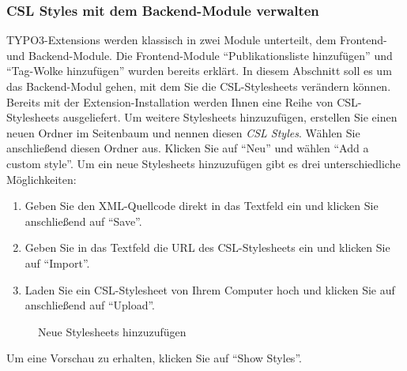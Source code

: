 \subsubsection*{CSL Styles mit dem Backend-Module verwalten}\label{typo3CslBackend}
\newline
TYPO3-Extensions werden klassisch in zwei Module unterteilt, dem Frontend- und Backend-Module. Die Frontend-Module \enquote{Publikationsliste hinzufügen} und \enquote{Tag-Wolke hinzufügen} wurden bereits erklärt. In diesem Abschnitt soll es um das Backend-Modul gehen, mit dem Sie die CSL-Stylesheets verändern können.\newline \newline
Bereits mit der Extension-Installation werden Ihnen eine Reihe von CSL-Stylesheets ausgeliefert. Um weitere Stylesheets hinzuzufügen, erstellen Sie einen neuen Ordner im Seitenbaum und nennen diesen \textit{CSL Styles}. Wählen Sie anschließend diesen Ordner aus. Klicken Sie auf \enquote{Neu} und wählen \enquote{Add a custom style}.\newline \newline
Um ein neue Stylesheets hinzuzufügen gibt es drei unterschiedliche Möglichkeiten:
\begin{enumerate}
\item Geben Sie den XML-Quellcode direkt in das Textfeld ein und klicken Sie anschließend auf \enquote{Save}.
\item Geben Sie in das Textfeld die URL des CSL-Stylesheets ein und klicken Sie auf \enquote{Import}.
\item Laden Sie ein CSL-Stylesheet von Ihrem Computer hoch und klicken Sie auf anschließend auf \enquote{Upload}. 
\end{enumerate}
\begin{figure}[h!]
 \centering
 \caption{Neue Stylesheets hinzuzufügen}
 \label{fig:neueStylesheets}
\end{figure}
Um eine Vorschau zu erhalten, klicken Sie auf \enquote{Show Styles}.\newline

